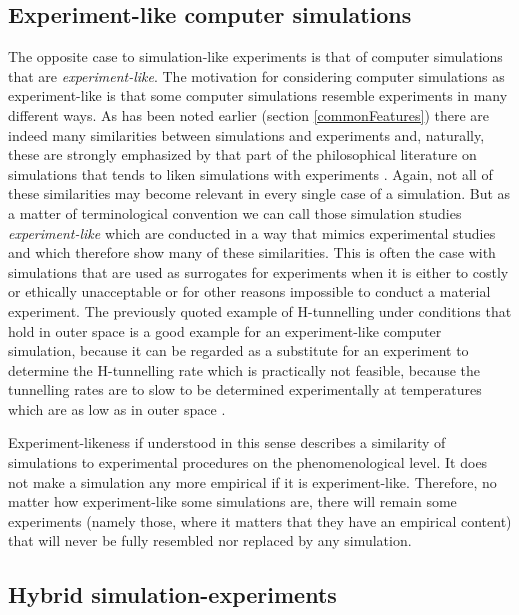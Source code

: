 \documentclass[onecollarge]{STJour}
\numberwithin{equation}{section}
\begin{document}
\subsection{Experiment-like computer simulations}

The opposite case to simulation-like experiments is that of computer simulations that are \emph{experiment-like}. The motivation for considering computer simulations as experiment-like is that some computer simulations resemble experiments in many different ways. As has been noted earlier (section \ref{commonFeatures}) there are indeed many similarities between simulations and experiments and, naturally, these are strongly emphasized by that part of the philosophical literature on simulations that tends to liken simulations with experiments \citep{morrison:2009, parker:2009, winsberg:2010}. Again, not all of these similarities may become relevant in every single case of a simulation. But as a matter of terminological convention we can call those simulation studies \emph{experiment-like} which are conducted in a way that mimics experimental studies and which therefore show many of these similarities. This is often the case with simulations that are used as surrogates for experiments when it is either to costly or ethically unacceptable or for other reasons impossible to conduct a material experiment. The previously quoted example of H-tunnelling under conditions that hold in outer space is a good example for an experiment-like computer simulation, because it can be regarded as a substitute for an experiment to determine the H-tunnelling rate which is practically not feasible, because the tunnelling rates are to slow to be determined experimentally at temperatures which are as low as in outer space \citep[p. 7351]{goumans-kaestner:2010}.

Experiment-likeness if understood in this sense describes a similarity of simulations to experimental procedures on the phenomenological level. It does not make a simulation any more empirical if it is experiment-like. Therefore, no matter how experiment-like some simulations are, there will remain some experiments (namely those, where it matters that they have an empirical content) that will never be fully resembled nor replaced by any simulation.


\subsection{Hybrid simulation-experiments}
\label{hybridExperiments}
\end{document}
